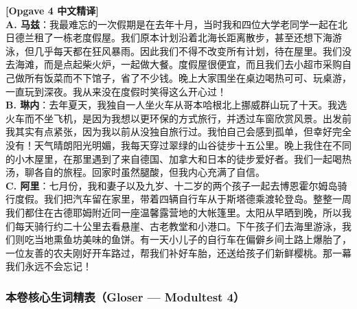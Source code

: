 \begin{answerbox}
\textbf{\color{NCDTeal}[Opgave 4 中文精译]}\\
\textbf{A. 马兹}：我最难忘的一次假期是在去年十月，当时我和四位大学老同学一起在北日德兰租了一栋老度假屋。我们原本计划沿着北海长距离散步，甚至还想下海游泳，但几乎每天都在狂风暴雨。因此我们不得不改变所有计划，待在屋里。我们没去海滩，而是点起柴火炉，一起做大餐。度假屋很便宜，而且我们去小超市采购自己做所有饭菜而不下馆子，省了不少钱。晚上大家围坐在桌边喝热可可、玩桌游，一直玩到深夜。我从来没在度假时笑得这么开心过！\\
\textbf{B. 琳内}：去年夏天，我独自一人坐火车从哥本哈根北上挪威群山玩了十天。我选火车而不坐飞机，是因为我想以更环保的方式旅行，并透过车窗欣赏风景。出发前我其实有点紧张，因为我以前从没独自旅行过。我怕自己会感到孤单，但幸好完全没有！天气晴朗阳光明媚，我每天穿过翠绿的山谷徒步十五公里。晚上我住在不同的小木屋里，在那里遇到了来自德国、加拿大和日本的徒步爱好者。我们一起喝热汤，聊各自的旅程。回家时虽然腿酸，但我内心充满了自信。\\
\textbf{C. 阿里}：七月份，我和妻子以及九岁、十二岁的两个孩子一起去博恩霍尔姆岛骑行度假。我们把汽车留在家里，带着四辆自行车从于斯塔德乘渡轮登岛。整整一周我们都住在古德耶姆附近同一座温馨露营地的大帐篷里。太阳从早晒到晚，所以我们每天骑行约二十公里去看悬崖、古老教堂和小港口。下午孩子们去海里游泳，我们则吃当地熏鱼坊美味的鱼饼。有一天小儿子的自行车在偏僻乡间土路上爆胎了，一位友善的农夫刚好开车路过，帮我们补好车胎，还送给孩子们新鲜樱桃。那一幕我们永远不会忘记！
\end{answerbox}

\subsubsection*{本卷核心生词精表（Gloser --- Modultest 4）}

